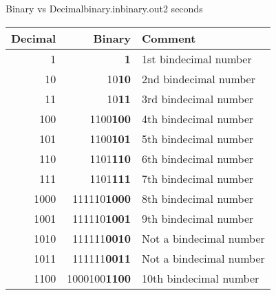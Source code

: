 \begin{problem}{Binary vs Decimal}{binary.in}{binary.out}{2 seconds}
\begin{center}
\begin{tabular}{|r|r|l|}
\hline
Decimal & Binary & Comment \\
\hline
1 & {\bf 1} & 1st bindecimal number \\
\hline
10 & 10{\bf 10} & 2nd bindecimal number \\
\hline
11 & 10{\bf 11} & 3rd bindecimal number \\
\hline
100 & 1100{\bf 100} & 4th bindecimal number \\
\hline
101 & 1100{\bf 101} & 5th bindecimal number \\
\hline
110 & 1101{\bf 110} & 6th bindecimal number \\
\hline
111 & 1101{\bf 111} & 7th bindecimal number \\
\hline
1000 & 111110{\bf 1000} & 8th bindecimal number \\
\hline
1001 & 111110{\bf 1001} & 9th bindecimal number \\
\hline
1010 & 111111{\bf 0010} & Not a bindecimal number \\
\hline
1011 & 111111{\bf 0011} & Not a bindecimal number \\
\hline
1100 & 1000100{\bf 1100} & 10th bindecimal number \\
\hline
\end{tabular}

\end{center}

\end{problem}

